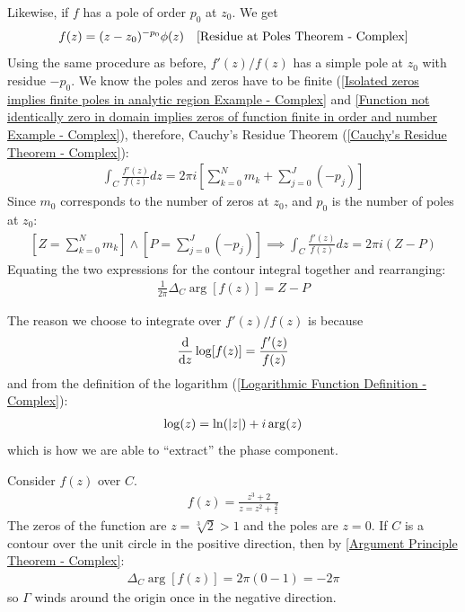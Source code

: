 \documentclass[12pt, english]{book}
\makeatletter
\renewenvironment{proof}[1][\proofname]{\par
	\pushQED{\qed}%
	\normalfont \topsep6\p@\@plus6\p@\relax
	\list{}{%
		\settowidth{\leftmargin}{\itshape\proofname:\hskip\labelsep}%
		\setlength{\labelwidth}{0pt}%
		\setlength{\itemindent}{-\leftmargin}%
		}%
	\item[\hskip\labelsep\itshape#1\@addpunct{:}]\ignorespaces
	}{\popQED\endlist\@endpefalse}
\makeatother
\begin{document}
\begin{proof}
		Likewise, if \(f\) has a pole of order \(p_0\) at \(z_0\). We get
		\begin{align*}
			f(z) &= (z-z_0)^{-p_0} \phi(z) & \text{\Cref{Residue at Poles Theorem - Complex}}
		\end{align*}
		Using the same procedure as before, \(f'(z)/f(z)\) has a simple pole at \(z_0\) with residue \(-p_0\). We know the poles and zeros have to be finite (\cref{Isolated zeros implies finite poles in analytic region Example - Complex} and \cref{Function not identically zero in domain implies zeros of function finite in order and number Example - Complex}), therefore, Cauchy's Residue Theorem (\cref{Cauchy's Residue Theorem - Complex}):
		\begin{align*}
			\int_{C} \frac{f'(z)}{f(z)} dz 
			= 2\pi i \left[\sum_{k=0}^{N} m_k + \sum_{j=0}^{J} (-p_j) \right] 
		\end{align*}
		Since \(m_0\) corresponds to the number of zeros at \(z_0\), and \(p_0\) is the number of poles at \(z_0\):
		\begin{align*}
			\left[Z = \sum_{k=0}^{N} m_k\right] \land \left[P = \sum_{j=0}^{J} (-p_j)\right]
			\implies \int_{C} \frac{f'(z)}{f(z)} dz = 2\pi i (Z - P)
		\end{align*}
		Equating the two expressions for the contour integral together and rearranging:
		\begin{align*}
			\frac{1}{2\pi} \Delta_C \arg[f(z)] = Z - P
		\end{align*}
	\end{proof}

	\begin{observation}
		The reason we choose to integrate over \(f'(z)/f(z)\) is because
		\begin{align*}
			\dv{z} \log[f(z)] = \frac{f'(z)}{f(z)}
		\end{align*}
		and from the definition of the logarithm (\cref{Logarithmic Function Definition - Complex}):
		\begin{align*}
			\log(z) = \ln(\abs{z}) + i \arg(z)
		\end{align*}
		which is how we are able to ``extract'' the phase component.  
	\end{observation}
	
	\begin{example}
		Consider \(f(z)\) over \(C\). 
		\begin{align*}
			f(z) = \frac{z^3 + 2}{z = z^2 + \frac{2}{z}}
		\end{align*}
		The zeros of the function are \(z = \sqrt[3]{2} > 1\) and the poles are \(z = 0\). If \(C\) is a contour over the unit circle in the positive direction, then by \cref{Argument Principle Theorem - Complex}:
		\begin{align*}
			\Delta_{C} \arg[f(z)] = 2\pi (0-1) = -2\pi
		\end{align*}
		so \(\Gamma\) winds around the origin once in the negative direction.
	\end{example}
\end{document}
